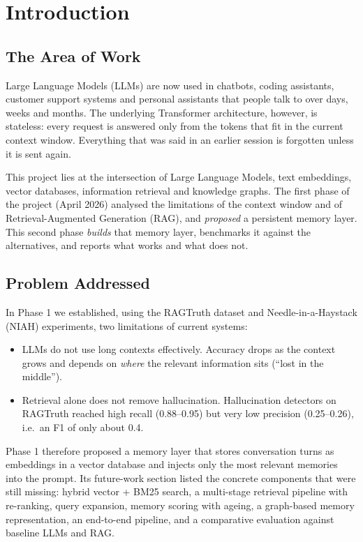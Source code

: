 \chapter{Introduction}

\section{The Area of Work}
Large Language Models (LLMs) are now used in chatbots, coding assistants, customer support systems and
personal assistants that people talk to over days, weeks and months. The underlying Transformer
architecture, however, is stateless: every request is answered only from the tokens that fit in the current
context window. Everything that was said in an earlier session is forgotten unless it is sent again.

This project lies at the intersection of Large Language Models, text embeddings, vector databases,
information retrieval and knowledge graphs. The first phase of the project (April 2026) analysed the
limitations of the context window and of Retrieval-Augmented Generation (RAG), and \emph{proposed} a
persistent memory layer. This second phase \emph{builds} that memory layer, benchmarks it against the
alternatives, and reports what works and what does not.

\section{Problem Addressed}
In Phase 1 we established, using the RAGTruth dataset and Needle-in-a-Haystack (NIAH) experiments, two
limitations of current systems:
\begin{itemize}[nosep]
  \item LLMs do not use long contexts effectively. Accuracy drops as the context grows and depends on
        \emph{where} the relevant information sits (``lost in the middle'').
  \item Retrieval alone does not remove hallucination. Hallucination detectors on RAGTruth reached high
        recall (0.88--0.95) but very low precision (0.25--0.26), i.e.\ an F1 of only about 0.4.
\end{itemize}
Phase 1 therefore proposed a memory layer that stores conversation turns as embeddings in a vector
database and injects only the most relevant memories into the prompt. Its future-work section listed the
concrete components that were still missing: hybrid vector + BM25 search, a multi-stage retrieval pipeline
with re-ranking, query expansion, memory scoring with ageing, a graph-based memory representation, an
end-to-end pipeline, and a comparative evaluation against baseline LLMs and RAG.

